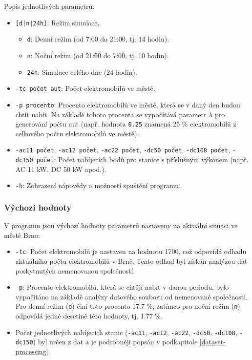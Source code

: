\documentclass[a4paper,11pt]{article}
\begin{document}
Popis jednotlivých parametrů:
\begin{itemize}
    \item \texttt{[d|n|24h]}: Režim simulace.
    \begin{itemize}
        \item \texttt{d}: Denní režim (od 7:00 do 21:00, tj. 14 hodin).
        \item \texttt{n}: Noční režim (od 21:00 do 7:00, tj. 10 hodin).
        \item \texttt{24h}: Simulace celého dne (24 hodin).
    \end{itemize}
    \item \texttt{-tc počet\_aut}: Počet elektromobilů ve městě.
    \item \texttt{-p procento}: Procento elektromobilů ve městě, která se v daný den budou chtít nabít. Na základě tohoto procenta se vypočítává parametr \(\lambda\) pro generování počtu aut (např. hodnota \texttt{0.25} znamená 25 \% elektromobilů z celkového počtu elektromobilů ve městě).
    \item \texttt{-ac11 počet}, \texttt{-ac12 počet}, \texttt{-ac22 počet}, \texttt{-dc50 počet}, \texttt{-dc108 počet}, \texttt{-dc150 počet}: Počet nabíjecích bodů pro stanice s příslušným výkonem (např. AC 11 kW, DC 50 kW apod.).
    \item \texttt{-h}: Zobrazení nápovědy a možností spuštění programu.
\end{itemize}


\subsubsection{Výchozí hodnoty}
V programu jsou výchozí hodnoty parametrů nastaveny na aktuální situaci ve městě Brno:
\begin{itemize}

    \item \texttt{-tc}: Počet elektromobilů je nastaven na hodnotu 1700, což odpovídá odhadu aktuálního počtu elektromobilů v Brně. Tento odhad byl získán analýzou dat poskytnutých nemenovanou společností.
    \item \texttt{-p}: Procento elektromobilů, která se chtějí nabít v danou periodu, bylo vypočítáno na základě analýzy datového souboru od nemenované společnosti. Pro denní režim (\texttt{d}) činí toto procento 17.7 \%, zatímco pro noční režim (\texttt{n}) odpovídá jedné desetině této hodnoty, tj. 1.77 \%.
    \item Počet jednotlivých nabíjecích stanic (\texttt{-ac11}, \texttt{-ac12}, \texttt{-ac22}, \texttt{-dc50}, \texttt{-dc108}, \texttt{-dc150}) byl určen z dat a je podrobněji popsán v podkapitole \ref{dataset-processing}.
\end{itemize}
\end{document}
